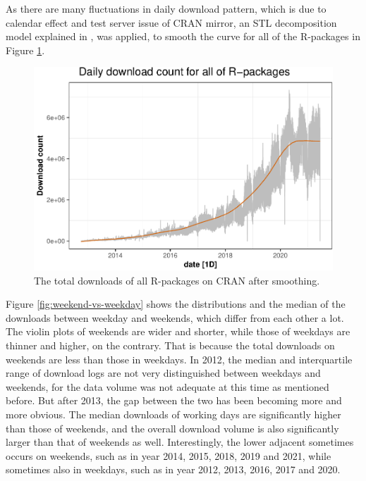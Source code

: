 \documentclass[
]{book}
\begin{document}
As there are many fluctuations in daily download pattern, which is due to calendar effect and test server issue of CRAN mirror, an STL decomposition model explained in \citet{stl}, was applied, to smooth the curve for all of the R-packages in Figure \ref{fig:pkg-stl}.



\begin{figure}

{\centering \includegraphics{figures/pkg-stl-1} 

}

\caption{The total downloads of all R-packages on CRAN after smoothing.}\label{fig:pkg-stl}
\end{figure}

Figure \ref{fig:weekend-vs-weekday} shows the distributions and the median of the downloads between weekday and weekends, which differ from each other a lot. The violin plots of weekends are wider and shorter, while those of weekdays are thinner and higher, on the contrary. That is because the total downloads on weekends are less than those in weekdays. In 2012, the median and interquartile range of download logs are not very distinguished between weekdays and weekends, for the data volume was not adequate at this time as mentioned before. But after 2013, the gap between the two has been becoming more and more obvious. The median downloads of working days are significantly higher than those of weekends, and the overall download volume is also significantly larger than that of weekends as well. Interestingly, the lower adjacent sometimes occurs on weekends, such as in year 2014, 2015, 2018, 2019 and 2021, while sometimes also in weekdays, such as in year 2012, 2013, 2016, 2017 and 2020.
\end{document}

